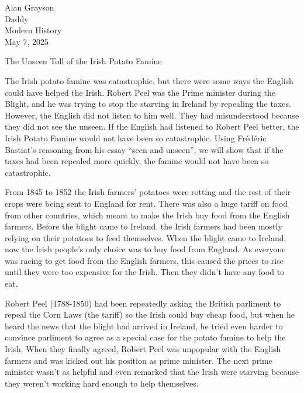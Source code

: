 \documentclass[12pt]{article}
\begin{document}
\begin{flushleft}

Alan Grayson\\
Daddy\\
Modern History\\
May 7, 2025\\


\begin{center}
The Unseen Toll of the Irish Potato Famine
\end{center}

\setlength{\parindent}{0.5in}

The Irish potato famine was catastrophic, but there were some ways the
English could have helped the Irish.  Robert Peel was the Prime
minister during the Blight, and he was trying to stop the starving in
Ireland by repealing the taxes. However, the English did not listen to
him well. They had misunderstood because they did not see the
unseen. If the English had listened to Robert Peel better, the Irish
Potato Famine would not have been so catastrophic. Using Frédéric
Bastiat's reasoning from his essay ``seen and unseen'', we will show
that if the taxes had been repealed more quickly, the famine would not
have been so catastrophic.


From 1845 to 1852 the Irish farmers' potatoes were rotting and the
rest of their crops were being sent to England for rent. There was
also a huge tariff on food from other countries, which meant to make
the Irish buy food from the English farmers. Before the
blight came to Ireland, the Irish farmers had been mostly relying on
their potatoes to feed themselves. When the blight came to Ireland,
now the Irish people's only choice was to buy food from England. As
everyone was racing to get food from the English farmers, this caused
the prices to rise until they were too expensive for the Irish. Then
they didn't have any food to eat.



Robert Peel (1788-1850) had been repeatedly asking the British
parliment to repeal the Corn Laws (the tariff) so the Irish could buy
cheap food, but when he heard the news that the blight had arrived in
Ireland, he tried even harder to convince parliment to agree as a
special case for the potato famine to help the Irish. When they
finally agreed, Robert Peel was unpopular with the English farmers and
was kicked out his position as prime minister. The next prime minister
wasn't as helpful and even remarked that the Irish were starving
because they weren't working hard enough to help themselves.




\end{flushleft}
\end{document}
